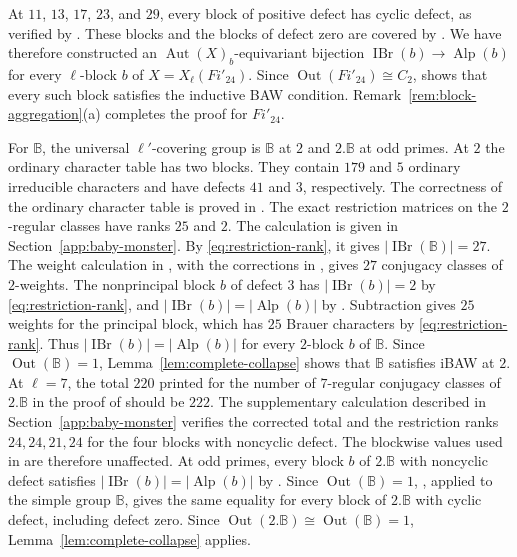 \documentclass[10pt]{amsart}
\theoremstyle{definition}
\let\oldendproof\endproof
\renewenvironment{proof}[1][\proofname]{%
  \oldproof[\bfseries #1]%
}{\oldendproof}
\DeclareMathOperator{\Aut}{Aut}
\DeclareMathOperator{\Out}{Out}
\DeclareMathOperator{\IBr}{IBr}
\DeclareMathOperator{\Alp}{Alp}
\newcommand{\Baby}{\mathbb B}
\numberwithin{equation}{section}
\numberwithin{table}{section}
\begin{document}
\begin{proof}
At $11$, $13$, $17$, $23$, and $29$, every block of positive defect has cyclic
defect, as verified by . These blocks and the blocks of
defect zero are covered by \cite[Proposition~6.2]{Spath2013}. We have therefore constructed an
$\Aut(X)_b$-equivariant bijection $\IBr(b)\to\Alp(b)$ for every
$\ell$-block $b$ of $X=X_\ell(Fi'_{24})$.
Since $\Out(Fi'_{24})\cong C_2$, \cite[Corollary~2.13]{FengLiZhang2019}
shows that every such block satisfies the inductive BAW condition.
Remark~\ref{rem:block-aggregation}\textup{(a)} completes the proof for $Fi'_{24}$.

For $\Baby$, the universal $\ell'$-covering group is $\Baby$ at $2$ and
$2.\Baby$ at odd primes.  At $2$ the ordinary character table has two
blocks.  They contain $179$ and $5$ ordinary irreducible characters and
have defects $41$ and $3$, respectively.  The correctness of
the ordinary character table is proved in
\cite[Section~7]{BreuerMagaardWilsonBaby2020}.  The exact restriction
matrices on the $2$-regular classes have ranks $25$ and $2$.  The
calculation is given in Section~\ref{app:baby-monster}.  By
\eqref{eq:restriction-rank}, it gives $|\IBr(\Baby)|=27$.  The weight calculation in
\cite[proof of Theorem~4.2 and Table~2]{AnDietrich2012}, with the
corrections in \cite{AnDietrichErratum}, gives $27$ conjugacy classes
of $2$-weights.  The nonprincipal block $b$ of
defect $3$ has $|\IBr(b)|=2$ by \eqref{eq:restriction-rank}, and
$|\IBr(b)|=|\Alp(b)|$ by \cite[Theorem~13.7]{Sambale2014}.
Subtraction gives $25$ weights for the principal block, which has $25$
Brauer characters by \eqref{eq:restriction-rank}.  Thus
$|\IBr(b)|=|\Alp(b)|$ for every $2$-block $b$ of $\Baby$.  Since
$\Out(\Baby)=1$, Lemma~\ref{lem:complete-collapse} shows that $\Baby$
satisfies iBAW at $2$.
At $\ell=7$, the total $220$ printed for the number of
$7$-regular conjugacy classes of $2.\Baby$ in the proof of
\cite[Lemma~5.2]{AnWilsonBaby} should be $222$.  The supplementary
calculation described in Section~\ref{app:baby-monster} verifies the
corrected total and the restriction ranks $24,24,21,24$ for the four
blocks with noncyclic defect.  The blockwise values used in
\cite[Theorem~5.3]{AnWilsonBaby} are therefore unaffected.
At odd primes, every block $b$ of $2.\Baby$ with noncyclic defect
satisfies $|\IBr(b)|=|\Alp(b)|$ by \cite[Theorem~5.3]{AnWilsonBaby}.
Since $\Out(\Baby)=1$, \cite[Proposition~6.2]{Spath2013}, applied to
the simple group $\Baby$, gives the same equality for every block of
$2.\Baby$ with cyclic defect, including defect zero.  Since
$\Out(2.\Baby)\cong\Out(\Baby)=1$,
Lemma~\ref{lem:complete-collapse} applies.


\end{proof}
\end{document}
